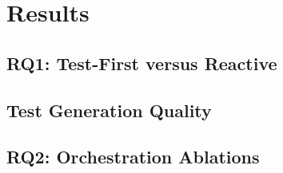 \section{Results}
\label{sec:results}

\subsection{RQ1: Test-First versus Reactive}
\label{sec:results-rq1}

\subsection{Test Generation Quality}
\label{sec:results-brt}

\subsection{RQ2: Orchestration Ablations}
\label{sec:results-rq2}

